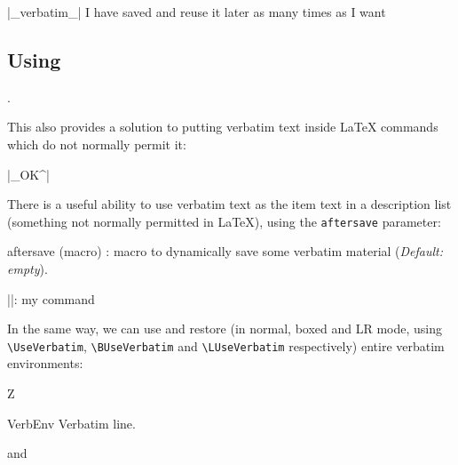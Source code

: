 \documentclass{article}
\newcommand\cs[1]{\texttt{\textbackslash#1}}
\providecommand\optname[1]{\textsf{#1}}
\newenvironment{optlist}{\begin{description}%
  \renewcommand\makelabel[1]{%
    \descriptionlabel{\mdseries\optname{##1}}}%
  \itemsep0.25\itemsep}%
 {\end{description}}
\begin{document}
\begin{SideBySideExample}
  \DefineShortVerb{\|}
  |_verbatim_|
  I have saved  and reuse 
  it later as many times as I want
  \subsection*{Using }
  .
\end{SideBySideExample}

  This also provides a solution to putting verbatim text inside \LaTeX{}
commands which do not normally permit it: %

{
\begin{Example}
  \DefineShortVerb{\|}|_OK^| 
\end{Example}
}

  There is a useful ability to use verbatim text as the item text in a
description list (something not normally permitted in \LaTeX), using the
\texttt{aftersave} parameter:

\begin{optlist}
  \item[aftersave (macro)]: macro to dynamically save some verbatim material
  (\emph{Default: empty}).
\end{optlist}

\begin{SideBySideExample}
  \newcommand{\Vitem}{%
    }
  \DefineShortVerb{\|}
  \begin{description}
    \Vitem|\MyCommand|: my command
  \end{description}
\end{SideBySideExample}

  In the same way, we can use and restore (in normal, boxed and LR mode,
using \cs{UseVerbatim}, \cs{BUseVerbatim} and \cs{LUseVerbatim} respectively)
entire verbatim environments:

\begin{SideBySideExample}
  Z
  \begin{SaveVerbatim}{VerbEnv}
    Verbatim line.
  \end{SaveVerbatim}
  and 
\end{SideBySideExample}
\end{document}
